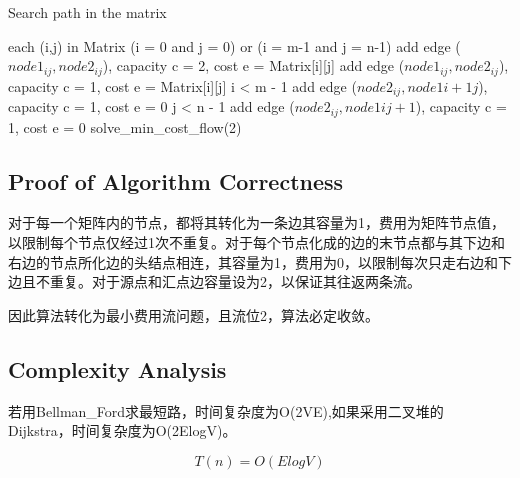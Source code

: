 \documentclass{article}
\begin{document}
\begin{algorithm}[htbp]  
  \caption{Search path in the matrix}  
  \begin{algorithmic}[1] 
	\For each (i,j) in Matrix
	\If (i = 0 and j = 0) or (i = m-1 and j = n-1)
	\State add edge ($node1_{ij}, node2_{ij}$), capacity c = 2, cost e = Matrix[i][j]
	\Else
	\State add edge ($node1_{ij}, node2_{ij}$), capacity c = 1, cost e = Matrix[i][j]
	\EndIf
	\If i < m - 1 
	\State add edge ($node2_{ij}, node1{i+1j}$), capacity c = 1, cost e = 0
	\EndIf
	\If j < n - 1
	\State add edge ($node2_{ij}, node1{ij+1}$), capacity c = 1, cost e = 0
	\EndIf
	\EndFor
	\State solve\_min\_cost\_flow(2)
    \EndFunction 
  \end{algorithmic}  
\end{algorithm} 

\subsection{Proof of Algorithm Correctness}
对于每一个矩阵内的节点，都将其转化为一条边其容量为1，费用为矩阵节点值，以限制每个节点仅经过1次不重复。对于每个节点化成的边的末节点都与其下边和右边的节点所化边的头结点相连，其容量为1，费用为0，以限制每次只走右边和下边且不重复。对于源点和汇点边容量设为2，以保证其往返两条流。

因此算法转化为最小费用流问题，且流位2，算法必定收敛。


\subsection{Complexity Analysis}
若用Bellman\_Ford求最短路，时间复杂度为O(2VE),如果采用二叉堆的 Dijkstra，时间复杂度为O(2ElogV)。

\begin{equation}
T(n) = O(ElogV)
\end{equation}

\end{document}
